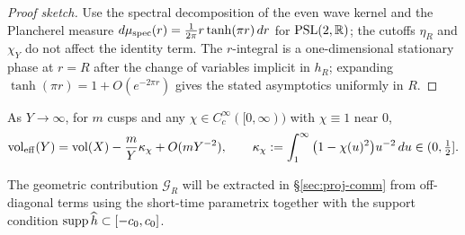 \begin{proof}[Proof sketch]
Use the spectral decomposition of the even wave kernel and the Plancherel measure $d\mu_{\rm spec}(r)=\frac{1}{2\pi}r\tanh(\pi r)\,dr$ for $\mathrm{PSL}(2,\mathbb{R})$; the cutoffs $\eta_R$ and $\chi_Y$ do not affect the identity term. The $r$-integral is a one-dimensional stationary phase at $r=R$ after the change of variables implicit in $h_R$; expanding $\tanh(\pi r)=1+O(e^{-2\pi r})$ gives the stated asymptotics uniformly in $R$.
\end{proof}

\begin{remark}\label{rem:veff}
As $Y\to\infty$, for $m$ cusps and any $\chi\in C_c^\infty([0,\infty))$ with $\chi\equiv1$ near $0$,
\[
\operatorname{vol}_{\mathrm{eff}}(Y)=\operatorname{vol}(X)-\frac{m}{Y}\kappa_\chi+O(mY^{-2}),
\qquad
\kappa_\chi:=\int_1^\infty \big(1-\chi(u)^2\big)u^{-2}\,du\in(0,\tfrac12].
\]
\end{remark}

The geometric contribution $\mathcal{G}_R$ will be extracted in \S\ref{sec:proj-comm} from off-diagonal terms using the short-time parametrix together with the support condition $\operatorname{supp} \widehat{h}\subset[-c_0,c_0]$.
